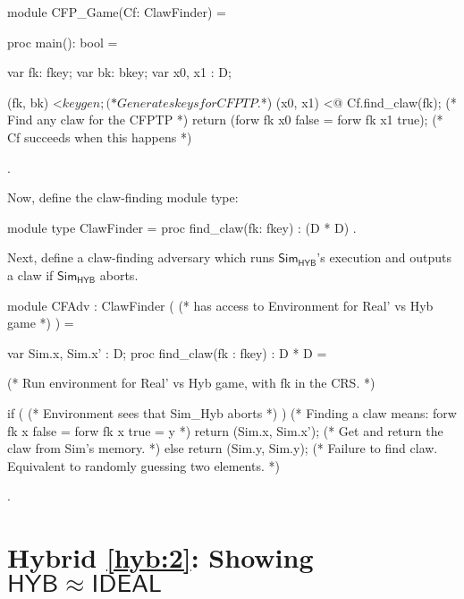 \documentclass{article}[12pt]
\newcommand{\Simulator}{{\mathsf{Sim}}} %
\newcommand{\Ideal}{{\mathsf{IDEAL}}}
\newcommand{\Hyb}{{\mathsf{HYB}}}
\newcommand{\Real}{{\mathsf{REAL}}}
\begin{document}
\begin{easycrypt}[label=code:mod_cfgame, caption={Module representing the claw-finding game.}]
module CFP_Game(Cf: ClawFinder) = {
	proc main(): bool = {
		var fk: fkey; var bk: bkey;
		var x0, x1 : D;

		(fk, bk) <$ keygen;             (* Generates keys for CFPTP. $*)
		(x0, x1) <@ Cf.find_claw(fk);   (* Find any claw for the CFPTP *)
		return (forw fk x0 false = forw fk x1 true); (* Cf succeeds when this happens *)
	}
}.
\end{easycrypt}

Now, define the claw-finding module type:

\begin{easycrypt}[label=code:mod_type_cfadv, caption={Module type for a claw-finding adversary.}]
module type ClawFinder = {
	proc find_claw(fk: fkey) : (D * D)
}.
\end{easycrypt}

Next, define a claw-finding adversary which runs $\Simulator_\Hyb$'s execution and outputs a claw if $\Simulator_\Hyb$ aborts.

\begin{easycrypt}[label=code:mod_cfadv, caption={Module instantiating a claw-finding adversary using access to an environment distinguishing $\Real'$ and $\Hyb$.}]
module CFAdv : ClawFinder ( (* has access to Environment for Real' vs Hyb game *) ) = {
	var Sim.x, Sim.x' : D;
	proc find_claw(fk : fkey) : D * D = {

		(* Run environment for Real' vs Hyb game, with fk in the CRS. *)

		if ( (* Environment sees that Sim_Hyb aborts *) ) {
			(* Finding a claw means: forw fk x false = forw fk x true = y *)
			return (Sim.x, Sim.x'); (* Get and return the claw from Sim's memory. *)
		}
		else {
			return (Sim.y, Sim.y); (* Failure to find claw. Equivalent to randomly guessing two elements. *)
		}
	}
}.
\end{easycrypt}

\section{Hybrid \ref{hyb:2}: Showing $\Hyb \approx \Ideal$}
\end{document}
